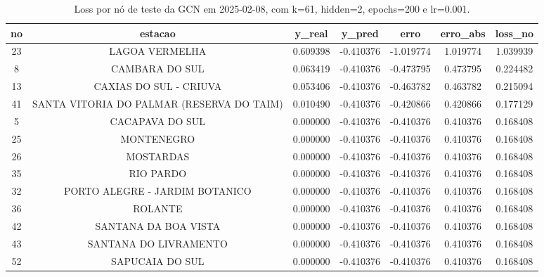 \begin{table}[h]
\centering
\caption{Loss por nó de teste da GCN em 2025-02-08, com k=61, hidden=2, epochs=200 e lr=0.001.}
\label{tab:gcn_loss_nodes_k61_hidden2}
\begin{tabular}{ccccccc}
\toprule
no & estacao & y\_real & y\_pred & erro & erro\_abs & loss\_no \\
\midrule
23 & LAGOA VERMELHA & 0.609398 & -0.410376 & -1.019774 & 1.019774 & 1.039939 \\
8 & CAMBARA DO SUL & 0.063419 & -0.410376 & -0.473795 & 0.473795 & 0.224482 \\
13 & CAXIAS DO SUL - CRIUVA & 0.053406 & -0.410376 & -0.463782 & 0.463782 & 0.215094 \\
41 & SANTA VITORIA DO PALMAR (RESERVA DO TAIM) & 0.010490 & -0.410376 & -0.420866 & 0.420866 & 0.177129 \\
5 & CACAPAVA DO SUL & 0.000000 & -0.410376 & -0.410376 & 0.410376 & 0.168408 \\
25 & MONTENEGRO & 0.000000 & -0.410376 & -0.410376 & 0.410376 & 0.168408 \\
26 & MOSTARDAS & 0.000000 & -0.410376 & -0.410376 & 0.410376 & 0.168408 \\
35 & RIO PARDO & 0.000000 & -0.410376 & -0.410376 & 0.410376 & 0.168408 \\
32 & PORTO ALEGRE - JARDIM BOTANICO & 0.000000 & -0.410376 & -0.410376 & 0.410376 & 0.168408 \\
36 & ROLANTE & 0.000000 & -0.410376 & -0.410376 & 0.410376 & 0.168408 \\
42 & SANTANA DA BOA VISTA & 0.000000 & -0.410376 & -0.410376 & 0.410376 & 0.168408 \\
43 & SANTANA DO LIVRAMENTO & 0.000000 & -0.410376 & -0.410376 & 0.410376 & 0.168408 \\
52 & SAPUCAIA DO SUL & 0.000000 & -0.410376 & -0.410376 & 0.410376 & 0.168408 \\
\bottomrule
\end{tabular}
\end{table}
